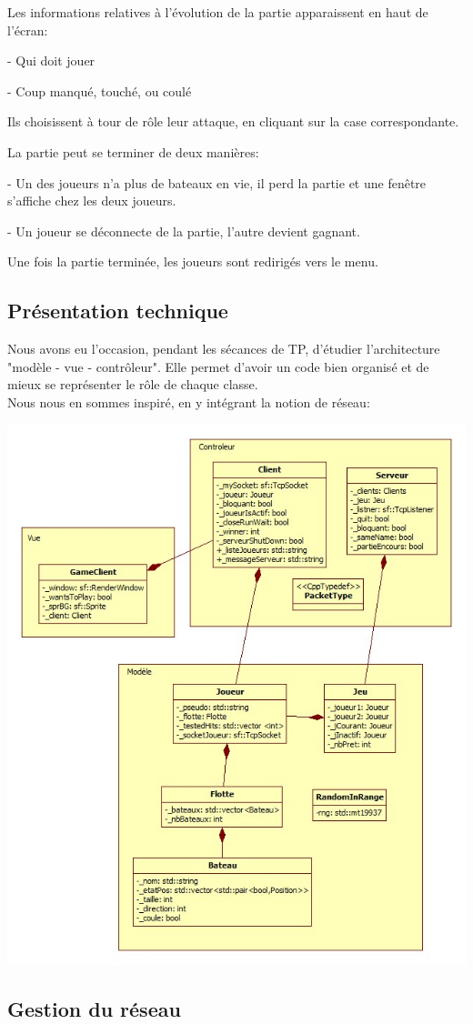 \documentclass[a4paper,oneside]{article}
\begin{document}
Les informations relatives à l'évolution de la partie apparaissent en haut de l'écran:


	- Qui doit jouer


	- Coup manqué, touché, ou coulé

\clearpage

Ils choisissent à tour de rôle leur attaque, en cliquant sur la case correspondante.


La partie peut se terminer de deux manières:


	- Un des joueurs n'a plus de bateaux en vie, il perd la partie et une fenêtre s'affiche chez les deux joueurs.


	- Un joueur se déconnecte de la partie, l'autre devient gagnant.

 
Une fois la partie terminée, les joueurs sont redirigés vers le menu.


\subsection{Présentation technique}

Nous avons eu l'occasion, pendant les sécances de TP, d'étudier l'architecture "modèle - vue - contrôleur". 
Elle permet d'avoir un code bien organisé et de mieux se représenter le rôle de chaque classe.
\\
Nous nous en sommes inspiré, en y intégrant la notion de réseau:
\\

\begin{center}
		\includegraphics[width = 0.5\linewidth, height = 0.5\textheight ]{MVC_BattleShip.jpg}
\end{center}

\subsection{Gestion du réseau}
\end{document}
